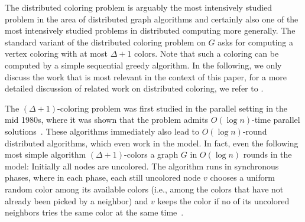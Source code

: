 The distributed coloring problem is arguably the most intensively studied problem in the area of distributed graph algorithms and certainly also one of the most intensively studied problems in distributed computing more generally. The standard variant of the distributed coloring problem on $G$ asks for computing a vertex coloring with at most $\Delta+1$ colors. Note that such a coloring can be computed by a simple sequential greedy algorithm. In the following, we only discuss the work that is most relevant in the context of this paper, for a more detailed discussion of related work on distributed coloring, we refer to \cite{barenboimelkin_book,chang18_coloring,kuhn20_coloring}.

The $(\Delta+1)$-coloring problem was first studied in the parallel setting in the mid 1980s, where it was shown that the problem admits $O(\log n)$-time parallel solutions~\cite{alon86,luby86}. These algorithms immediately also lead to $O(\log n)$-round distributed algorithms, which even work in the \CONGEST model. In fact, even the following most simple algorithm $(\Delta+1)$-colors a graph $G$ in $O(\log n)$ rounds in the \CONGEST model: Initially all nodes are uncolored. The algorithm runs in synchronous phases, where in each phase, each still uncolored node $v$ chooses a uniform random color among its available colors (i.e., among the colors that have not already been picked by a neighbor) and $v$ keeps the color if no of its uncolored neighbors tries the same color at the same time~\cite{johansson99,BEPS12}.

